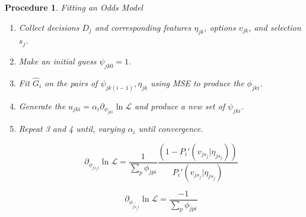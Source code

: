\documentclass[11pt]{article}
\newtheorem{procedure}{Procedure}
\begin{document}
\begin{procedure}{Fitting an Odds Model}
\begin{enumerate}
\item Collect decisions $D_j$ and corresponding features $\eta_{jk}$, options $v_{jk}$, and selection $s_j$. 
\item Make an initial guess $\psi_{jk0} = 1$.
\item Fit $\hat{G}_i$ on the pairs of $\psi_{jk(i-1)},\eta_{jk}$ using MSE to produce the $\phi_{jki}$.
\item Generate the $u_{jki} = \alpha_i \partial_{\phi_{jki}} \ln{\mathcal{L}}$ and produce a new set of $\psi_{jki}$.
\item Repeat 3 and 4 until, varying $\alpha_i$ until convergence. 

$$\partial_{\phi_{js_ji}}\ln{\mathcal{L}}=\frac{1}{\sum_p \phi_{jpi}}\frac{\left(1-P_i'(v_{js_j} | \eta_{js_j}) \right)}{P_i'(v_{js_j} | \eta_{js_j})}$$ 

$$\partial_{\phi_{j\not{s_j}i}}\ln{\mathcal{L}}=\frac{-1 }{\sum_p \phi_{jpi}}$$ 
\end{enumerate}

\end{procedure}
\end{document}
